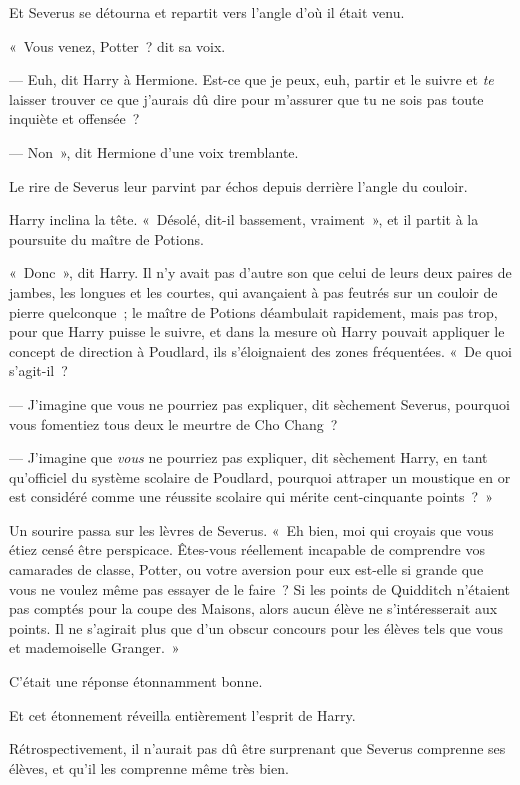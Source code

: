 Et Severus se détourna et repartit vers l'angle d'où il était venu.

«~Vous venez, Potter~? dit sa voix.

--- Euh, dit Harry à Hermione. Est-ce que je peux, euh, partir et le suivre et \emph{te} laisser trouver ce que j'aurais dû dire pour m'assurer que tu ne sois pas toute inquiète et offensée~?

--- Non~», dit Hermione d'une voix tremblante.

Le rire de Severus leur parvint par échos depuis derrière l'angle du couloir.

Harry inclina la tête. «~Désolé, dit-il bassement, vraiment~», et il partit à la poursuite du maître de Potions.

\later

«~Donc~», dit Harry. Il n'y avait pas d'autre son que celui de leurs deux paires de jambes, les longues et les courtes, qui avançaient à pas feutrés sur un couloir de pierre quelconque~; le maître de Potions déambulait rapidement, mais pas trop, pour que Harry puisse le suivre, et dans la mesure où Harry pouvait appliquer le concept de direction à Poudlard, ils s'éloignaient des zones fréquentées. «~De quoi s'agit-il~?

--- J'imagine que vous ne pourriez pas expliquer, dit sèchement Severus, pourquoi vous fomentiez tous deux le meurtre de Cho Chang~?

--- J'imagine que \emph{vous} ne pourriez pas expliquer, dit sèchement Harry, en tant qu'officiel du système scolaire de Poudlard, pourquoi attraper un moustique en or est considéré comme une réussite scolaire qui mérite cent-cinquante points~?~»

Un sourire passa sur les lèvres de Severus. «~Eh bien, moi qui croyais que vous étiez censé être perspicace. Êtes-vous réellement incapable de comprendre vos camarades de classe, Potter, ou votre aversion pour eux est-elle si grande que vous ne voulez même pas essayer de le faire~? Si les points de Quidditch n'étaient pas comptés pour la coupe des Maisons, alors aucun élève ne s'intéresserait aux points. Il ne s'agirait plus que d'un obscur concours pour les élèves tels que vous et mademoiselle Granger.~»

C'était une réponse étonnamment bonne.

Et cet étonnement réveilla entièrement l'esprit de Harry.

Rétrospectivement, il n'aurait pas dû être surprenant que Severus comprenne ses élèves, et qu'il les comprenne même très bien.

